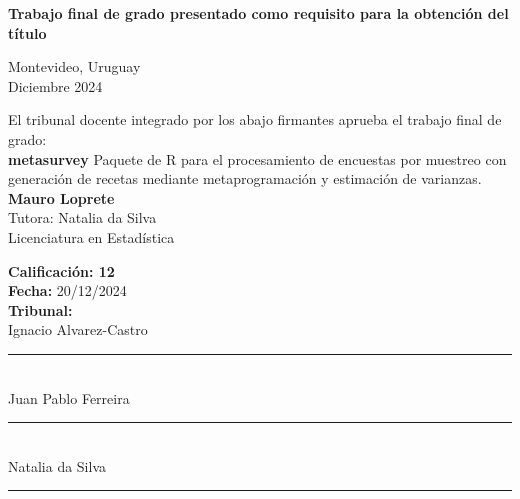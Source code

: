 \begin{titlepage}
\begin{center}
\vfill

\large \textbf{Trabajo final de grado presentado como requisito para la obtención del título \degreename}\\[0.3cm] %
 
\vfill

{\large Montevideo, Uruguay}\\[0.5cm] %

{\large Diciembre 2024}\\[0.5cm] %




 
\vfill
\end{center}
\end{titlepage}

\newpage

\begin{center}
    El tribunal docente integrado por los abajo firmantes aprueba el trabajo final de grado:\\
    \medskip
    \vspace{1cm}
    \textbf{\large metasurvey} Paquete de R para el procesamiento de encuestas por muestreo con generación de recetas mediante metaprogramación y estimación de varianzas.\\
    \vspace{2cm}
    \textbf{Mauro Loprete}\\
    \vspace{1cm}
    \noindent Tutora: Natalia da Silva\\
    \vspace{1cm}
    Licenciatura en Estadística\\
    \end{center}
    \vspace{3cm}
    
    \begin{flushleft}
    \textbf{Calificación: 12} \\
    \vspace{0.8cm}
    \textbf{Fecha:} 20/12/2024\\
    \vspace{1cm}
    \textbf{Tribunal:}\\
    \vspace{0.8cm}
    Ignacio Alvarez-Castro {\rule{0.5\textwidth}{.4pt}}\\
    \vspace{0.8cm}
    Juan Pablo Ferreira{\rule{0.5\textwidth}{.4pt}}\\
    \vspace{0.8cm}
    Natalia da Silva {\rule{0.5\textwidth}{.4pt}}\\

    \end{flushleft}



